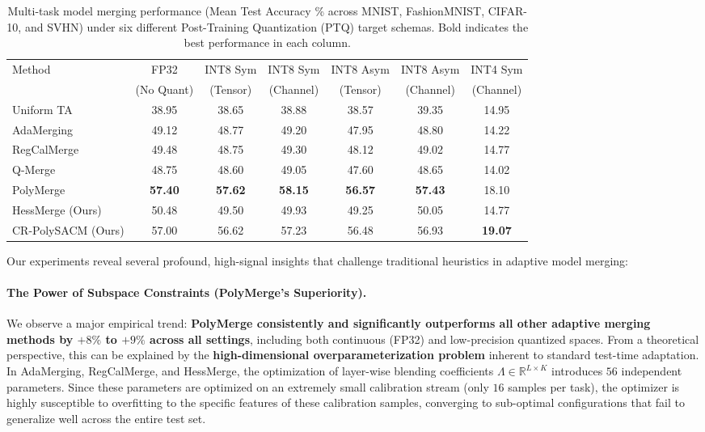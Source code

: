 \begin{table}[t]
\caption{Multi-task model merging performance (Mean Test Accuracy \% across MNIST, FashionMNIST, CIFAR-10, and SVHN) under six different Post-Training Quantization (PTQ) target schemas. Bold indicates the best performance in each column.}
\label{tab:merging_results}
\begin{center}
\begin{small}
\begin{sc}
\begin{tabular}{lcccccc}
\toprule
Method & FP32 & INT8 Sym & INT8 Sym & INT8 Asym & INT8 Asym & INT4 Sym \\
 & (No Quant) & (Tensor) & (Channel) & (Tensor) & (Channel) & (Channel) \\
\midrule
Uniform TA & 38.95 & 38.65 & 38.88 & 38.57 & 39.35 & 14.95 \\
AdaMerging & 49.12 & 48.77 & 49.20 & 47.95 & 48.80 & 14.22 \\
RegCalMerge & 49.48 & 48.75 & 49.30 & 48.12 & 49.02 & 14.77 \\
Q-Merge & 48.75 & 48.60 & 49.05 & 47.60 & 48.65 & 14.02 \\
PolyMerge & \textbf{57.40} & \textbf{57.62} & \textbf{58.15} & \textbf{56.57} & \textbf{57.43} & 18.10 \\
HessMerge (Ours) & 50.48 & 49.50 & 49.93 & 49.25 & 50.05 & 14.77 \\
CR-PolySACM (Ours) & 57.00 & 56.62 & 57.23 & 56.48 & 56.93 & \textbf{19.07} \\
\bottomrule
\end{tabular}
\end{sc}
\end{small}
\end{center}
\end{table}

Our experiments reveal several profound, high-signal insights that challenge traditional heuristics in adaptive model merging:

\paragraph{The Power of Subspace Constraints (PolyMerge's Superiority).}
We observe a major empirical trend: \textbf{PolyMerge consistently and significantly outperforms all other adaptive merging methods by $+8\%$ to $+9\%$ across all settings}, including both continuous (FP32) and low-precision quantized spaces. From a theoretical perspective, this can be explained by the \textbf{high-dimensional overparameterization problem} inherent to standard test-time adaptation. In AdaMerging, RegCalMerge, and HessMerge, the optimization of layer-wise blending coefficients $\Lambda \in \mathbb{R}^{L \times K}$ introduces $56$ independent parameters. Since these parameters are optimized on an extremely small calibration stream (only $16$ samples per task), the optimizer is highly susceptible to overfitting to the specific features of these calibration samples, converging to sub-optimal configurations that fail to generalize well across the entire test set. 

